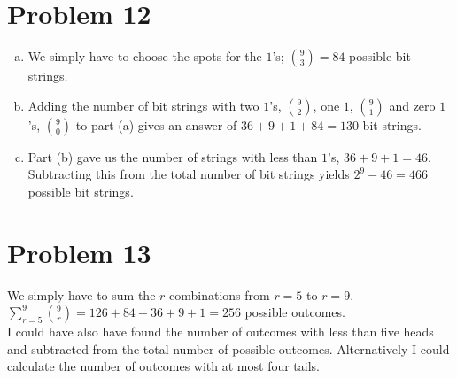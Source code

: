 \documentclass[11pt]{article}
\begin{document}
\section*{Problem 12}
\begin{enumerate}[(a)]
	\item
	We simply have to choose the spots for the $1$'s; ${9 \choose 3} = 84$ possible bit strings.
	\item
	Adding the number of bit strings with two $1$'s, $9 \choose 2$, one $1$, $9 \choose 1$ and zero $1$'s, $9 \choose 0$ to part (a) gives an 
	answer of $36 + 9 + 1 + 84 = 130$ bit strings.

	\item
	Part (b) gave us the number of strings with less than $1$'s, $36 + 9 + 1 =46$. Subtracting this from the total number of bit strings yields 
	 $2^9 - 46 = 466$ possible bit strings.
\end{enumerate}

\section*{Problem 13}
	We simply have to sum the $r$-combinations from $r = 5$ to $r = 9$.\\
	
	$\displaystyle\sum\limits_{r = 5}^9 {9 \choose r} = 126 + 84 + 36 + 9 + 1 = 256$ possible outcomes.\\
	
	I could have also have found the number of outcomes with less than five heads and subtracted from the total number of possible outcomes. 
	Alternatively I could calculate the number of outcomes with at most four tails.
\end{document}
